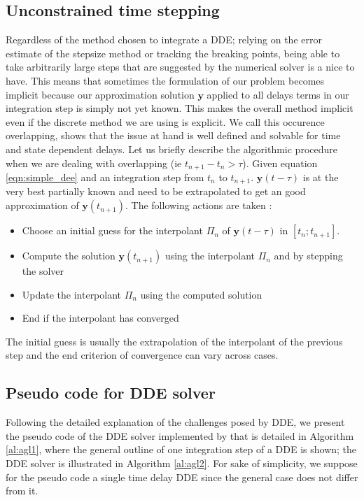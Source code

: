 \documentclass[pmlr]{jmlr}%
\begin{document}
\subsection{Unconstrained time stepping}

Regardless of the method chosen to integrate a DDE; relying on the error estimate of the stepsize method or tracking the breaking points, being able to take arbitrarily large steps that are suggested by the numerical solver is a nice to have. This means that sometimes the formulation of our problem becomes implicit because our approximation solution $\mathbf{y}$ applied to all delays terms in our integration step is simply not yet known. This makes the overall method implicit even if the discrete method we are using is explicit. We call this occurence overlapping, \cite{numerical_dde} shows that the issue at hand is well defined and solvable for time and state dependent delays. Let us briefly describe the algorithmic procedure when we are dealing with overlapping (ie $t_{n+1}-t_n >\tau$). Given equation \ref{eqn:simple_dee} and an integration step from $t_n$ to $t_{n+1}$. $\mathbf{y}(t-\tau)$ is at the very best partially known and need to be extrapolated to get an good approximation of $\mathbf{y}(t_{n+1})$. The following actions are taken : 
\begin{itemize}[noitemsep,topsep=0pt] 
    \item Choose an initial guess for the interpolant $\Pi_n$ of $\mathbf{y}(t-\tau)$ in $[t_n;t_{n+1}]$.
    \item Compute the solution $\mathbf{y}(t_{n+1})$ using the interpolant $\Pi_n$ and by stepping the solver
    \item Update the interpolant $\Pi_n$ using the computed solution
    \item End if the interpolant has converged
\end{itemize}
 
The initial guess is usually the extrapolation of the interpolant of the previous step and the end criterion of convergence can vary across cases.

\subsection{Pseudo code for DDE solver}

Following the detailed explanation of the challenges posed by DDE, we present the pseudo code of the DDE solver implemented by  \citet{numerical_dde} that is detailed in Algorithm \ref{al:agl1}, where the general outline of one integration step of a DDE is shown; the DDE solver is illustrated in Algorithm \ref{al:agl2}. For sake of simplicity, we suppose for the pseudo code a single time delay DDE since the general case does not differ from it.
\end{document}
